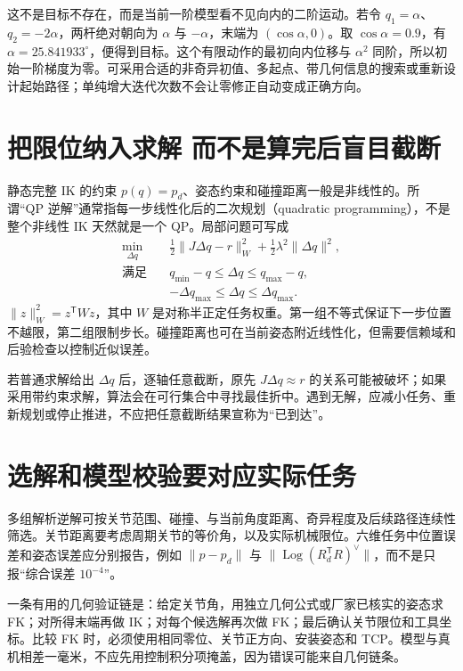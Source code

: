这不是目标不存在，而是当前一阶模型看不见向内的二阶运动。若令 $q_1=\alpha$、$q_2=-2\alpha$，两杆绝对朝向为 $\alpha$ 与 $-\alpha$，末端为 $(\cos\alpha,0)$。取 $\cos\alpha=0.9$，有 $\alpha=25.841933^\circ$，便得到目标。这个有限动作的最初向内位移与 $\alpha^2$ 同阶，所以初始一阶梯度为零。可采用合适的非奇异初值、多起点、带几何信息的搜索或重新设计起始路径；单纯增大迭代次数不会让零修正自动变成正确方向。

\section{把限位纳入求解 而不是算完后盲目截断}
静态完整 IK 的约束 $p(q)=p_d$、姿态约束和碰撞距离一般是非线性的。所谓“QP 逆解”通常指每一步线性化后的二次规划（quadratic programming），不是整个非线性 IK 天然就是一个 QP。局部问题可写成
\begin{equation}
 \begin{aligned}
 \min_{\Delta q}\quad&\tfrac12\|J\Delta q-r\|_W^2
                  +\tfrac12\lambda^2\|\Delta q\|^2,\\
 \text{满足}\quad&q_{\min}-q\le\Delta q\le q_{\max}-q,\\
                 &-\Delta q_{\max}\le\Delta q\le\Delta q_{\max}.
 \end{aligned}
\end{equation}
$\|z\|_W^2=z^\mathsf TWz$，其中 $W$ 是对称半正定任务权重。第一组不等式保证下一步位置不越限，第二组限制步长。碰撞距离也可在当前姿态附近线性化，但需要信赖域和后验检查以控制近似误差。

若普通求解给出 $\Delta q$ 后，逐轴任意截断，原先 $J\Delta q\approx r$ 的关系可能被破坏；如果采用带约束求解，算法会在可行集合中寻找最佳折中。遇到无解，应减小任务、重新规划或停止推进，不应把任意截断结果宣称为“已到达”。

\section{选解和模型校验要对应实际任务}
多组解析逆解可按关节范围、碰撞、与当前角度距离、奇异程度及后续路径连续性筛选。关节距离要考虑周期关节的等价角，以及实际机械限位。六维任务中位置误差和姿态误差应分别报告，例如 $\|p-p_d\|$ 与 $\|\operatorname{Log}(R_d^\mathsf TR)^\vee\|$，而不是只报“综合误差 $10^{-4}$”。

一条有用的几何验证链是：给定关节角，用独立几何公式或厂家已核实的姿态求 FK；对所得末端再做 IK；对每个候选解再次做 FK；最后确认关节限位和工具坐标。比较 FK 时，必须使用相同零位、关节正方向、安装姿态和 TCP。模型与真机相差一毫米，不应先用控制积分项掩盖，因为错误可能来自几何链条。

